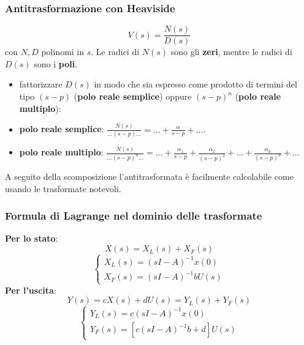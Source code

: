 \begin{landscape}
\begin{multicols*}{3}
    \subsubsection*{Antitrasformazione con Heaviside}
    \[
        V(s) = \frac{N(s)}{D(s)}
    \]
    con $N,D$ polinomi in $s$.\newline
    Le radici di $N(s)$ sono gli \textbf{zeri}, mentre le radici di $D(s)$ sono i \textbf{poli}.\newline
    \begin{itemize}
        \item fattorizzare $D(s)$ in modo che sia espresso come prodotto di termini del tipo $(s-p)$ (\textbf{polo reale semplice}) oppure $(s-p)^n$ (\textbf{polo reale multiplo}):
        \item \textbf{polo reale semplice}: $\frac{N(s)}{\dots(s-p)\dots} = \dots + \frac{\alpha}{s-p} + \dots$.
        \item \textbf{polo reale multiplo}: $\frac{N(s)}{\dots (s-p)^n \dots} = \dots + \frac{\alpha_1}{s-p} + \frac{\alpha_2}{(s-p)^2} + \dots + \frac{\alpha_n}{(s-p)^n} + \dots$
    \end{itemize}
    A seguito della scomposizione l'antitrasformata è facilmente calcolabile come usando le trasformate notevoli.
    \subsubsection*{Formula di Lagrange nel dominio delle trasformate}
    \textbf{Per lo stato}:
    \[
        X(s) = X_L(s) + X_F(s)
    \]
    \[
        \begin{cases}
            X_L(s) = (sI-A)^{-1} x(0)\\
            X_F(s) = (sI-A) ^{-1} b U(s)
        \end{cases}
    \]
    \textbf{Per l'uscita}:
    \[
        Y(s) = cX(s) + dU(s) = Y_L(s) + Y_F(s)
    \]
    \[
        \begin{cases}
            Y_L(s) = c(sI-A)^{-1} x(0)\\
            Y_F(s) = [c(sI-A)^{-1} b + d]U(s)
        \end{cases}
    \]

\end{multicols*}
\end{landscape}
